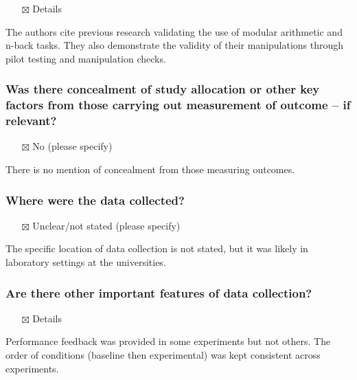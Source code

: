 \documentclass[
  doc, a4paper]{apa7}
\providecommand{\tightlist}{%
  \setlength{\itemsep}{0pt}\setlength{\parskip}{0pt}}
\begin{document}
\begin{itemize}
\tightlist
\item[$\boxtimes$]
  Details
\end{itemize}

The authors cite previous research validating the use of modular arithmetic and n-back tasks. They also demonstrate the validity of their manipulations through pilot testing and manipulation checks.

\subsubsection{Was there concealment of study allocation or other key factors from those carrying out measurement of outcome -- if relevant?}\label{was-there-concealment-of-study-allocation-or-other-key-factors-from-those-carrying-out-measurement-of-outcome-if-relevant}

\begin{itemize}
\tightlist
\item[$\boxtimes$]
  No (please specify)
\end{itemize}

There is no mention of concealment from those measuring outcomes.

\subsubsection{Where were the data collected?}\label{where-were-the-data-collected}

\begin{itemize}
\tightlist
\item[$\boxtimes$]
  Unclear/not stated (please specify)
\end{itemize}

The specific location of data collection is not stated, but it was likely in laboratory settings at the universities.

\subsubsection{Are there other important features of data collection?}\label{are-there-other-important-features-of-data-collection}

\begin{itemize}
\tightlist
\item[$\boxtimes$]
  Details
\end{itemize}

Performance feedback was provided in some experiments but not others. The order of conditions (baseline then experimental) was kept consistent across experiments.
\end{document}
